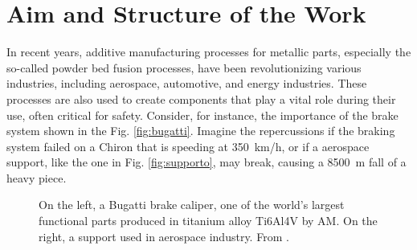 \section{Aim and Structure of the Work}
\label{sec:aimwork}
In recent years, additive manufacturing processes for metallic parts, especially the so-called powder bed fusion processes, have been revolutionizing various industries, including aerospace, automotive, and energy industries. These processes are also used to create components that play a vital role during their use, often critical for safety. Consider, for instance, the importance of the brake system shown in the Fig. \ref{fig:bugatti}. Imagine the repercussions if the braking system failed on a Chiron that is speeding at \SI{350}{\kilo\metre /\hour}, or if a aerospace support, like the one in Fig. \ref{fig:supporto}, may break, causing a \SI{8500}{\metre} fall of a heavy piece. 
\begin{figure}
    \centering
    \quad
    \caption[Functional AM part printed in metal.]{On the left, a Bugatti brake caliper, one of the world’s largest functional parts produced in titanium alloy Ti6Al4V by AM. On the right, a support used in aerospace industry. From \citeauthor{du_plessis_beautiful_2019}.}
    \label{fig:funcpart}
\end{figure}
